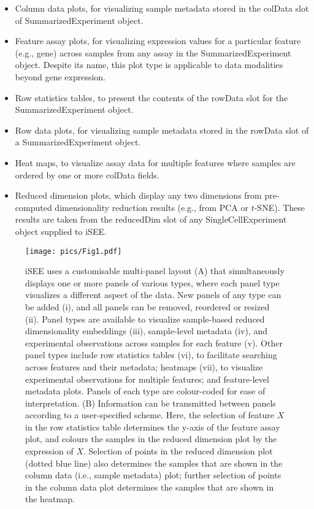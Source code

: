 \documentclass[10pt,a4paper,twocolumn]{article}
\begin{document}
\begin{itemize}
\item Column data plots, for visualizing sample metadata stored in the colData slot of SummarizedExperiment object.
\item Feature assay plots, for visualizing expression values for a particular feature (e.g., gene) across samples from any assay in the SummarizedExperiment object.
Despite its name, this plot type is applicable to data modalities beyond gene expression.
\item Row statistics tables, to present the contents of the rowData slot for the SummarizedExperiment object.
\item Row data plots, for visualizing sample metadata stored in the rowData slot of a SummarizedExperiment object.
\item Heat maps, to visualize assay data for multiple features where samples are ordered by one or more colData fields.
\item Reduced dimension plots, which display any two dimensions from pre-computed dimensionality reduction results (e.g., from PCA or $t$-SNE).
These results are taken from the reducedDim slot of any SingleCellExperiment object supplied to iSEE.
\end{itemize}

\begin{figure*}[t]
\texttt{[image: pics/Fig1.pdf]}
\caption{iSEE uses a customisable multi-panel layout (A) that simultaneously displays one or more panels of various types, where each panel type visualizes a different aspect of the data.
New panels of any type can be added (i), and all panels can be removed, reordered or resized (ii).
Panel types are available to visualize sample-based reduced dimensionality embeddings (iii), sample-level metadata (iv), and experimental observations across samples for each feature (v).
Other panel types include row statistics tables (vi), to facilitate searching across features and their metadata; heatmaps (vii), to visualize experimental observations for multiple features; and feature-level metadata plots.
Panels of each type are colour-coded for ease of interpretation.
(B) Information can be transmitted between panels according to a user-specified scheme.
Here, the selection of feature $X$ in the row statistics table determines the y-axis of the feature assay plot, and colours the samples in the reduced dimension plot by the expression of $X$.
Selection of points in the reduced dimension plot (dotted blue line) also determines the samples that are shown in the column data (i.e., sample metadata) plot;
further selection of points in the column data plot determines the samples that are shown in the heatmap.
}
\label{fig:iSEE}
\end{figure*}
\end{document}
